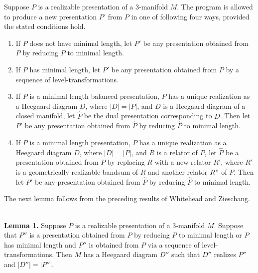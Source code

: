 \documentclass[12pt]{amsart}
\newcommand{\lemmaone}{\ \\ \noindent  \textbf{Lemma 1.} }
\begin{document}
                Suppose $P$ is a realizable presentation of a 3-manifold $M$. The program is
        allowed to produce a new presentation $P'$ from $P$ in one of following four ways,
        provided the stated conditions hold.            
        \begin{enumerate}
                \item     If $P$ does not have minimal length, let $P'$ be any presentation obtained
                        from $P$ by reducing $P$ to minimal length.
                        
                \item      If $P$ has minimal length, let $P'$ be any presentation obtained from $P$ by
                        a sequence of level-transformations.
                        
                \item      If $P$ is a minimal length balanced presentation, $P$ has a unique realization
                        as a Heegaard diagram $D$, where $|D| = |P|$, and $D$ is a Heegaard diagram of a
                        closed manifold, let $\hat P$ be the dual presentation corresponding to $D$. Then
                        let $P'$ be any presentation obtained from $\hat P$ by reducing $\hat P$ to minimal length.
                        
                \item      If $P$ is a minimal length presentation, $P$ has a unique realization as a
                        Heegaard diagram $D$, where $|D| = |P|$, and $R$ is a relator of $P$, let $\hat P$ be a
                        presentation obtained from $P$ by replacing $R$ with a new relator $R'$, where $R'$
                        is a geometrically realizable bandsum of $R$ and another relator $R"$ of $P$. Then
                        let $P'$ be any presentation obtained from $\hat P$ by reducing $\hat P$ to minimal length.             
         \end{enumerate}
        The next lemma follows from the preceding results of Whitehead and Zieschang.

\lemmaone       Suppose $P$ is a realizable presentation of a 3-manifold $M$. Suppose that $P''$
        is a presentation obtained from $P$ by reducing $P$ to minimal length or $P$ has minimal
        length and $P''$ is obtained from $P$ via a sequence of level-transformations. Then $M$ has
        a Heegaard diagram $D''$ such that $D''$ realizes $P''$ and $|D''| = |P''|$.
                
\end{document}
